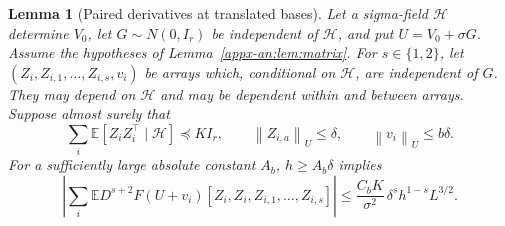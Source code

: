 \documentclass[11pt,letterpaper]{article}
\newtheorem{lemma}{Lemma}
\theoremstyle{remark}
\newcommand{\E}{\mathbb E}
\newcommand{\norm}[1]{\left\lVert#1\right\rVert}
\begin{document}
\begin{lemma}[Paired derivatives at translated bases]
\label{appx-an:lem:restoration}
Let a sigma-field \(\mathcal H\) determine \(V_0\), let
\(G\sim N(0,I_r)\) be independent of \(\mathcal H\), and put
\(U=V_0+\sigma G\).  Assume the hypotheses of
Lemma~\ref{appx-an:lem:matrix}.  For \(s\in\{1,2\}\), let
\((Z_i,Z_{i,1},\ldots,Z_{i,s},v_i)\) be arrays which, conditional
on \(\mathcal H\), are independent of \(G\).  They may depend on
\(\mathcal H\) and may be dependent within and between arrays.
Suppose almost surely that
\begin{equation}
 \sum_i\E[Z_iZ_i^\top\mid\mathcal H]\preceq KI_r,
 \qquad \norm{Z_{i,a}}_U\le\delta,
 \qquad \norm{v_i}_U\le b\delta.
 \label{appx-an:conditional-budget}
\end{equation}
For a sufficiently large absolute constant \(A_b\),
\(h\ge A_b\delta\) implies
\begin{equation}
 \left|\sum_i\E D^{s+2}F(U+v_i)
         [Z_i,Z_i,Z_{i,1},\ldots,Z_{i,s}]\right|
 \le\frac{C_bK}{\sigma^2}\,
                 \delta^s h^{1-s}L^{3/2}.
 \label{appx-an:restoration-bound}
\end{equation}
\end{lemma}
\end{document}
